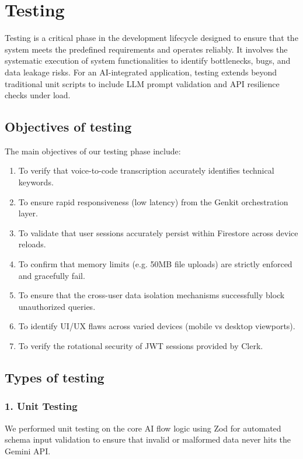 \chapter{Testing}

Testing is a critical phase in the development lifecycle designed to ensure that the system meets the predefined requirements and operates reliably. It involves the systematic execution of system functionalities to identify bottlenecks, bugs, and data leakage risks. For an AI-integrated application, testing extends beyond traditional unit scripts to include LLM prompt validation and API resilience checks under load.

\section{Objectives of testing}
The main objectives of our testing phase include:
\begin{enumerate}
    \item To verify that voice-to-code transcription accurately identifies technical keywords.
    \item To ensure rapid responsiveness (low latency) from the Genkit orchestration layer.
    \item To validate that user sessions accurately persist within Firestore across device reloads.
    \item To confirm that memory limits (e.g. 50MB file uploads) are strictly enforced and gracefully fail.
    \item To ensure that the cross-user data isolation mechanisms successfully block unauthorized queries.
    \item To identify UI/UX flaws across varied devices (mobile vs desktop viewports).
    \item To verify the rotational security of JWT sessions provided by Clerk.
\end{enumerate}

\section{Types of testing}

\subsection{1. Unit Testing}
We performed unit testing on the core AI flow logic using Zod for automated schema input validation to ensure that invalid or malformed data never hits the Gemini API.

